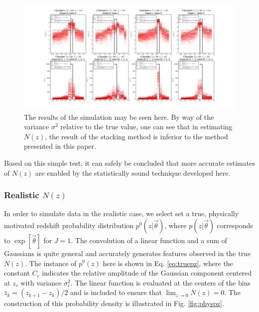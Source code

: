 \documentclass[preprint]{aastex}
\begin{document}
\begin{figure}
\includegraphics[width=\textwidth]{samps-toy.png}
\caption{The results of the simulation may be seen here.  By way of the variance $\sigma^{2}$ relative to the true value, one can see that in estimating $N(z)$, the result of the stacking method is inferior to the method presented in this paper.}
\label{fig:dumbestparam}
\end{figure}

Based on this simple test, it can safely be concluded that more accurate estimates of $N(z)$ are enabled by the statistically sound technique developed here.



\subsubsection{Realistic $N(z)$}
\label{sec:realnz}

In order to simulate data in the realistic case, we select set a true, physically motivated redshift probability distribution $p^{0}(z|\vec{\theta})$, where $p(z|\vec{\theta})$ corresponds to $\exp[\vec{\theta}]$ for $J=1$.  The convolution of a linear function and a sum of Gaussians is quite general and accurately generates features observed in the true $N(z)$.  The instance of $p^{0}(z)$ here is shown in Eq. \ref{eq:truepz}, where the constant $C_{c}$ indicates the relative amplitude of the Gaussian component centered at $z_{c}$ with variance $\sigma_{c}^{2}$.  The linear function is evaluated at the centers of the bins $\bar{z}_{k}=(z_{k+1}-z_{k})/2$ and is included to ensure that $\lim_{z\to0}N(z)=0$.  The construction of this probability density is illustrated in Fig. \ref{fig:physpz}.  %
\end{document}
